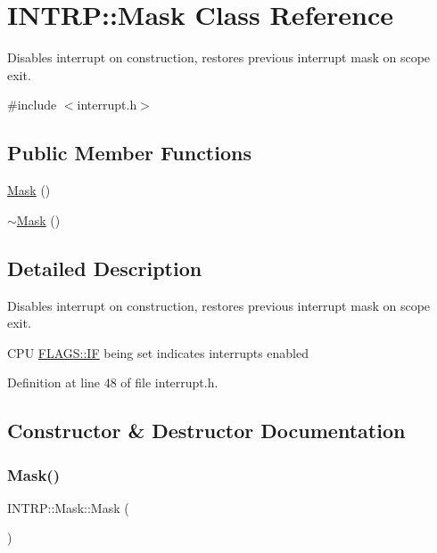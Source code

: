 \hypertarget{class_i_n_t_r_p_1_1_mask}{}\section{I\+N\+T\+RP\+:\+:Mask Class Reference}
\label{class_i_n_t_r_p_1_1_mask}


Disables interrupt on construction, restores previous interrupt mask on scope exit.  




{\ttfamily \#include $<$interrupt.\+h$>$}

\subsection*{Public Member Functions}
\begin{DoxyCompactItemize}
\item 
\hyperlink{class_i_n_t_r_p_1_1_mask_addd528b308ed524deeac0c632e07d467}{Mask} ()
\item 
\hyperlink{class_i_n_t_r_p_1_1_mask_a9510ca576c94618168e76d14521c3e6d}{$\sim$\+Mask} ()
\end{DoxyCompactItemize}


\subsection{Detailed Description}
Disables interrupt on construction, restores previous interrupt mask on scope exit. 

C\+PU \hyperlink{namespace_f_l_a_g_s_a9d5f9747a4879f4d57418def02a8fb51aec02296c8246d8621db2de2314b6728d}{F\+L\+A\+G\+S\+::\+IF} being set indicates interrupts enabled 

Definition at line 48 of file interrupt.\+h.



\subsection{Constructor \& Destructor Documentation}
\mbox{\label{class_i_n_t_r_p_1_1_mask_addd528b308ed524deeac0c632e07d467}} 
\subsubsection{\texorpdfstring{Mask()}{Mask()}}
{\footnotesize\ttfamily I\+N\+T\+R\+P\+::\+Mask\+::\+Mask (\begin{DoxyParamCaption}{ }\end{DoxyParamCaption})\hspace{0.3cm}{\ttfamily [inline]}}



